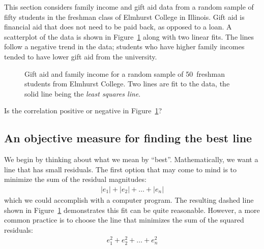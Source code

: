 This section considers family income and gift aid data from
a random sample of fifty students in the freshman class of
Elmhurst College in Illinois.
Gift aid is financial aid that does not need to be paid back,
as opposed to a loan.
A scatterplot of the data is shown in
Figure~\ref{elmhurstScatterW2Lines}
along with two linear fits.
The lines follow a negative trend in the data;
students who have higher family incomes tended to have lower
gift aid from the university.

\begin{figure}[h]
  \centering
  \caption{Gift aid and family income for a random sample of
      50~freshman students from Elmhurst College.
      Two lines are fit to the data, the solid line being the
      \emph{least squares line}.}
  \label{elmhurstScatterW2Lines}
\end{figure}

\begin{exercisewrap}
\begin{nexercise}
Is the correlation positive or negative in Figure~\ref{elmhurstScatterW2Lines}?\footnotemark
\end{nexercise}
\end{exercisewrap}


\subsection{An objective measure for finding the best line}

We begin by thinking about what we mean by ``best''.
Mathematically, we want a line that has small residuals.
The first option that may come to mind is to minimize the
sum of the residual magnitudes:
\begin{align*}
|e_1| + |e_2| + \dots + |e_n|
\end{align*}
which we could accomplish with a computer program.
The resulting dashed line shown in
Figure~\ref{elmhurstScatterW2Lines}
demonstrates this fit can be quite reasonable.
However, a more common practice is to choose the line that
minimizes the sum of the squared residuals:
\begin{align*}
e_{1}^2 + e_{2}^2 + \dots + e_{n}^2
\end{align*}



